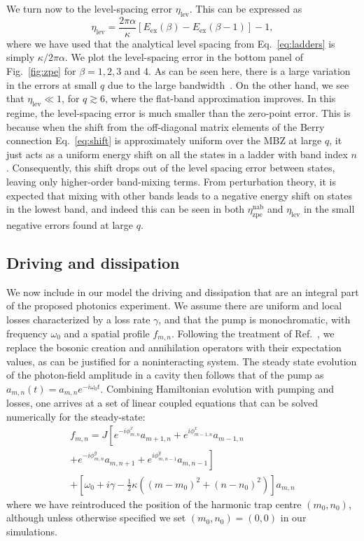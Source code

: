 We turn now to the level-spacing error $\eta_{\text{lev}}$. This can
be expressed as
\begin{equation} \eta_{\text{lev}} = \frac{2\pi \alpha}{\kappa}
[E_{\text{ex}}(\beta) - E_{\text{ex}}(\beta - 1)] -1,
\end{equation} where we have used that the analytical level spacing
from Eq.~\eqref{eq:ladders} is simply $\kappa / 2\pi \alpha$.  We plot
the level-spacing error in the bottom panel of Fig.~\ref{fig:zpe} for
$\beta = 1, 2, 3$ and 4. As can be seen here, there is a large
variation in the errors at small $q$ due to the large
bandwidth~\cite{ozawa2014momhh}. On the other hand, we see that
$\eta_{\text{lev}} \ll 1$, for $q \gtrsim 6$, where the flat-band
approximation improves. In this regime, the level-spacing error is
much smaller than the zero-point error. This is because when the shift
from the off-diagonal matrix elements of the Berry connection
Eq.~\eqref{eq:shift} is approximately uniform over the MBZ at large
$q$, it just acts as a uniform energy shift on all the states in a
ladder with band index $n$. Consequently, this shift drops out of the
level spacing error between states, leaving only higher-order
band-mixing terms. From perturbation theory, it is expected that
mixing with other bands leads to a negative energy shift on states in
the lowest band, and indeed this can be seen in both
$\eta_{\text{zpe}}^{\text{nab}}$ and $\eta_{\text{lev}}$ in the small
negative errors found at large $q$.

\subsection{Driving and dissipation}\label{sec:driven-dissipation}

We now include in our model the driving and dissipation that are an
integral part of the proposed photonics experiment. We assume there
are uniform and local losses characterized by a loss rate $\gamma$,
and that the pump is monochromatic, with frequency $\omega_0$ and a
spatial profile $f_{m,n}$. Following the treatment of
Ref.~\cite{ozawa2014qhe}, we replace the bosonic creation and
annihilation operators with their expectation values, as can be
justified for a noninteracting system. The steady state evolution of
the photon-field amplitude in a cavity then follows that of the pump
as $a_{m,n}(t) = a_{m,n} e^{-i \omega_0 t}$. Combining Hamiltonian
evolution with pumping and losses, one arrives at a set of linear
coupled equations that can be solved numerically for the
steady-state\cite{cohen1992atom}:
%
\begin{multline}\label{eq:linear_problem} f_{m,n}
=J\left[e^{-i\phi_{m,n}^x}a_{m+1,n}+e^{i\phi_{m-1,n}^x}a_{m-1,n}
\right. \\
\left. +e^{-i\phi_{m,n}^y}a_{m,n+1}+e^{i\phi_{m,n-1}^y}a_{m,n-1}\right]
\\ +\left[\omega_{0}+i\gamma-\frac{1}{2}\kappa
\left((m-m_0)^{2}+(n-n_0)^{2}\right)\right]a_{m,n}
\end{multline} where we have reintroduced the position of the harmonic
trap centre $(m_0, n_0)$, although unless otherwise specified we set
$(m_0, n_0)=(0,0)$ in our simulations.

